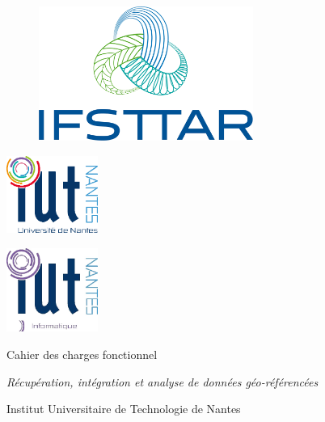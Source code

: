 \documentclass[french,12pt]{report}
\begin{document}
\begin{normalsize}

	\thispagestyle{empty}
	

   \begin{figure}[!h]
	\centerline{\includegraphics[width=7cm]{ifsttar.png}}	
   \end{figure}

    
    \begin{minipage}[c]{.46\linewidth}
     \begin{center}
             \includegraphics[width=3cm]{iut_nantes.png}
         \end{center}
   \end{minipage} \hfill
   \begin{minipage}[c]{.46\linewidth}
    \begin{center}
            \includegraphics[width=3cm]{iut_info_nantes.png}
        \end{center}
 \end{minipage}
 \vspace{2.5cm}
 	\begin{center}

 	
 	\begin{huge}
	Cahier des charges fonctionnel\\
	\end{huge}
	\vspace{0.75cm}
	\begin{large}
	\textit{Récupération, intégration et analyse de données géo-référencées} 
	\end{large}	
	\end{center}
 	\begin{center}
 	 \vspace{1cm}
Institut Universitaire de Technologie de Nantes\\
\vspace{0.5cm}


\end{center}
\end{normalsize}
\end{document}
